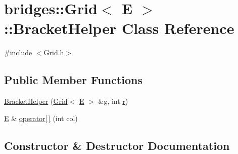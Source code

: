 \hypertarget{classbridges_1_1_grid_1_1_bracket_helper}{}\section{bridges\+:\+:Grid$<$ E $>$\+:\+:Bracket\+Helper Class Reference}
\label{classbridges_1_1_grid_1_1_bracket_helper}


{\ttfamily \#include $<$Grid.\+h$>$}

\subsection*{Public Member Functions}
\begin{DoxyCompactItemize}
\item 
\hyperlink{classbridges_1_1_grid_1_1_bracket_helper_a79d3a120c42bb844ec95fe67aca36847}{Bracket\+Helper} (\hyperlink{classbridges_1_1_grid}{Grid}$<$ \hyperlink{namespacebridges_acfb0a4f7877d8f63de3e6862004c50eda3a3ea00cfc35332cedf6e5e9a32e94da}{E} $>$ \&\hyperlink{namespacebridges_acfb0a4f7877d8f63de3e6862004c50edab2f5ff47436671b6e533d8dc3614845d}{g}, int \hyperlink{namespacebridges_acfb0a4f7877d8f63de3e6862004c50eda4b43b0aee35624cd95b910189b3dc231}{r})
\item 
\hyperlink{namespacebridges_acfb0a4f7877d8f63de3e6862004c50eda3a3ea00cfc35332cedf6e5e9a32e94da}{E} \& \hyperlink{classbridges_1_1_grid_1_1_bracket_helper_ad8055b8dd94d6988d8143ab7cf7d3386}{operator\mbox{[}$\,$\mbox{]}} (int col)
\end{DoxyCompactItemize}


\subsection{Constructor \& Destructor Documentation}
\mbox{\label{classbridges_1_1_grid_1_1_bracket_helper_a79d3a120c42bb844ec95fe67aca36847}} 
